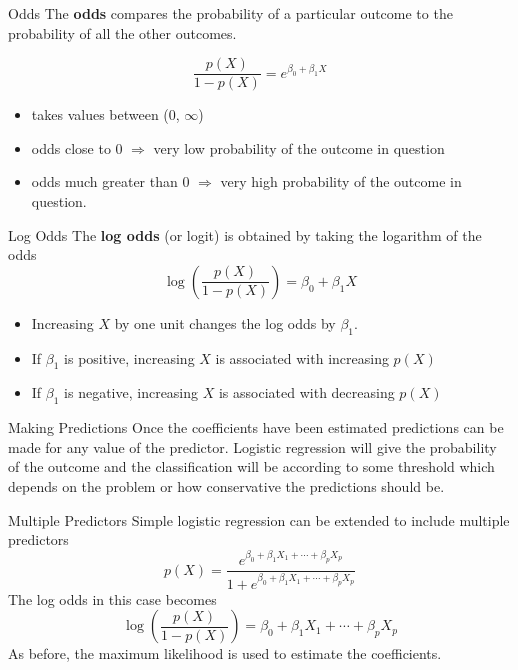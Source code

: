 \documentclass[
  ignorenonframetext,
  aspectratio=169,
]{beamer}
\begin{document}
\begin{frame}{Odds}
\protect\hypertarget{odds}{}
The \textbf{odds} compares the probability of a particular outcome to
the probability of all the other outcomes.

\[
    \frac{p(X)}{1-p(X)}=e^{\beta_{0}+\beta_{1} X}
\]

\begin{itemize}
\item
  takes values between (0, \(\infty\))
\item
  odds close to 0 \(\Rightarrow\) very low probability of the outcome in
  question
\item
  odds much greater than 0 \(\Rightarrow\) very high probability of the
  outcome in question.
\end{itemize}
\end{frame}

\begin{frame}{Log Odds}
\protect\hypertarget{log-odds}{}
The \textbf{log odds} (or logit) is obtained by taking the logarithm of
the odds \[
\log \left(\frac{p(X)}{1-p(X)}\right)=\beta_{0}+\beta_{1} X
\]

\begin{itemize}
\item
  Increasing \(X\) by one unit changes the log odds by \(\beta_1\).
\item
  If \(\beta_1\) is positive, increasing \(X\) is associated with
  increasing \(p(X)\)
\item
  If \(\beta_1\) is negative, increasing \(X\) is associated with
  decreasing \(p(X)\)
\end{itemize}
\end{frame}

\begin{frame}{Making Predictions}
\protect\hypertarget{making-predictions}{}
Once the coefficients have been estimated predictions can be made for
any value of the predictor. Logistic regression will give the
probability of the outcome and the classification will be according to
some threshold which depends on the problem or how conservative the
predictions should be.
\end{frame}

\begin{frame}{Multiple Predictors}
\protect\hypertarget{multiple-predictors}{}
Simple logistic regression can be extended to include multiple
predictors \[
p(X)=\frac{e^{\beta_{0}+\beta_{1} X_{1}+\cdots+\beta_{p} X_{p}}}{1+e^{\beta_{0}+\beta_{1} X_{1}+\cdots+\beta_{p} X_{p}}}
\] The log odds in this case becomes \[
\log \left(\frac{p(X)}{1-p(X)}\right)=\beta_{0}+\beta_{1} X_{1}+\cdots+\beta_{p} X_{p}
\] As before, the maximum likelihood is used to estimate the
coefficients.
\end{frame}
\end{document}
